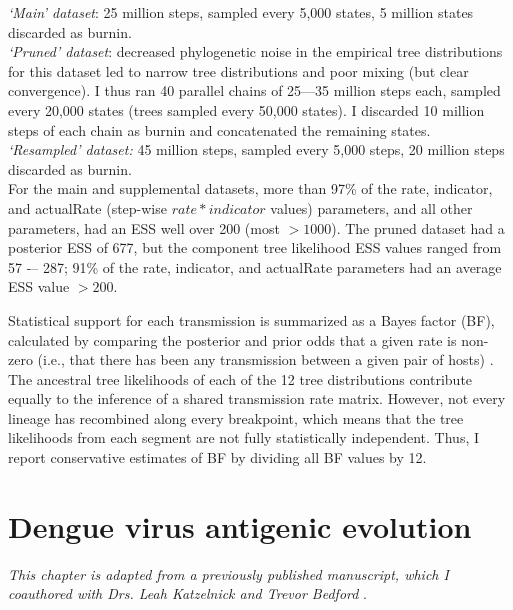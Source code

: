 \textit{`Main' dataset}: 25 million steps, sampled every 5,000 states, 5 million states discarded as burnin.\\
\textit{`Pruned' dataset}: decreased phylogenetic noise in the empirical tree distributions for this dataset led to narrow tree distributions and poor mixing (but clear convergence).
I thus ran 40 parallel chains of 25---35 million steps each, sampled every 20,000 states (trees sampled every 50,000 states).
I discarded 10 million steps of each chain as burnin and concatenated the remaining states. \\
\textit{`Resampled' dataset:} 45 million steps, sampled every 5,000 steps, 20 million steps discarded as burnin. \\

For the main and supplemental datasets, more than 97\% of the rate, indicator, and actualRate (step-wise $rate*indicator$ values) parameters, and all other parameters, had an ESS well over 200 (most $> 1000$).
The pruned dataset had a posterior ESS of 677, but the component tree likelihood ESS values ranged from 57 -– 287; 91\% of the rate, indicator, and actualRate parameters had an average ESS value $> 200$.

Statistical support for each transmission is summarized as a Bayes factor (BF), calculated by comparing the posterior and prior odds that a given rate is non-zero (i.e., that there has been any transmission between a given pair of hosts) \citep{lemey2009bayesian}.
The ancestral tree likelihoods of each of the 12 tree distributions contribute equally to the inference of a shared transmission rate matrix.
However, not every lineage has recombined along every breakpoint, which means that the tree likelihoods from each segment are not fully statistically independent.
Thus, I report conservative estimates of BF by dividing all BF values by 12.



\chapter{Dengue virus antigenic evolution}
\textit{This chapter is adapted from a previously published manuscript, which I coauthored with Drs. Leah Katzelnick and Trevor Bedford }\citep{bell2018dengue}.

